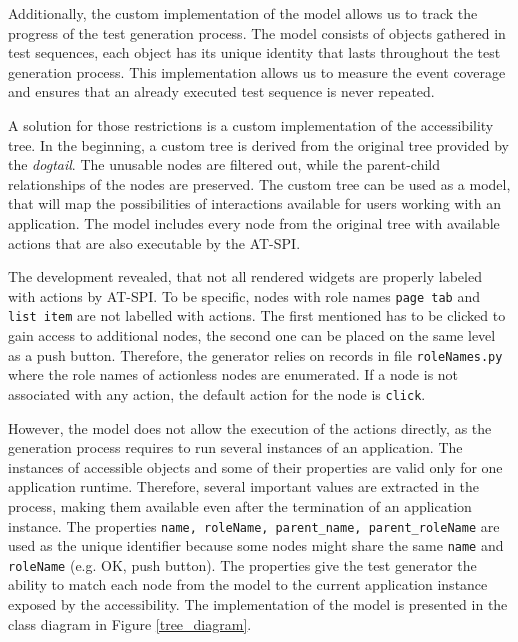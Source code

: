 Additionally, the custom implementation of the model allows us to track the progress of the test generation process. The model consists of objects gathered in test sequences, each object has its unique identity that lasts throughout the test generation process. This implementation allows us to measure the event coverage and ensures that an already executed test sequence is never repeated.

A solution for those restrictions is a custom implementation of the accessibility tree. In the beginning, a custom tree is derived from the original tree provided by the \textit{dogtail}. The unusable nodes are filtered out, while the parent-child relationships of the nodes are preserved. The custom tree can be used as a model, that will map the possibilities of interactions available for users working with an application. The model includes every node from the original tree with available actions that are also executable by the AT-SPI.

The development revealed, that not all rendered widgets are properly labeled with actions by AT-SPI. To be specific, nodes with role names \texttt{page tab} and \texttt{list item} are not labelled with actions. The first mentioned has to be clicked to gain access to additional nodes, the second one can be placed on the same level as a push button. Therefore, the generator relies on records in file \texttt{roleNames.py} where the role names of actionless nodes are enumerated. If a node is not associated with any action, the default action for the node is \texttt{click}.

However, the model does not allow the execution of the actions directly, as the generation process requires to run several instances of an application. The instances of accessible objects and some of their properties are valid only for one application runtime. Therefore, several important values are extracted in the process, making them available even after the termination of an application instance. The properties \texttt{name, roleName, parent\_name, parent\_roleName} are used as the unique identifier because some nodes might share the same \texttt{name} and \texttt{roleName} (e.g. OK, push button). The properties give the test generator the ability to match each node from the model to the current application instance exposed by the accessibility. The implementation of the model is presented in the class diagram in Figure \ref{tree_diagram}.

